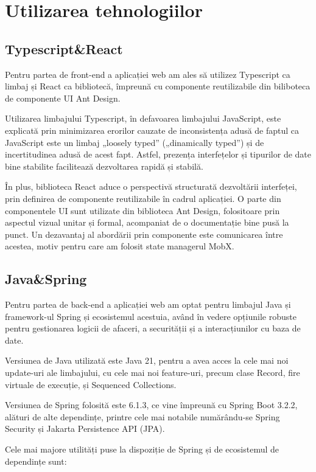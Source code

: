 \section{Utilizarea tehnologiilor}

\subsection{Typescript\&React}

Pentru partea de front-end a aplicației web am ales să utilizez Typescript ca limbaj și React ca bibliotecă, împreună cu componente reutilizabile din biliboteca de componente UI Ant Design.

Utilizarea limbajului Typescript, în defavoarea limbajului JavaScript, este explicată prin minimizarea erorilor cauzate de inconsistența adusă de faptul ca JavaScript este un limbaj „loosely typed” („dinamically typed”) și de incertitudinea adusă de acest fapt. Astfel, prezența interfețelor și tipurilor de date bine stabilite facilitează dezvoltarea rapidă și stabilă.

În plus, biblioteca React aduce o perspectivă structurată dezvoltării interfeței, prin definirea de componente reutilizabile în cadrul aplicației. O parte din componentele UI sunt utilizate din biblioteca Ant Design, folositoare prin aspectul vizual unitar și formal, acompaniat de o documentație bine pusă la punct. Un dezavantaj al abordării prin componente este comunicarea între acestea, motiv pentru care am folosit state managerul MobX. 

\subsection{Java\&Spring}
Pentru partea de back-end a aplicației web am optat pentru limbajul Java și framework-ul Spring și ecosistemul acestuia, având în vedere opțiunile robuste pentru gestionarea logicii de afaceri, a securității și a interacțiunilor cu baza de date.

Versiunea de Java utilizată este Java 21, pentru a avea acces la cele mai noi update-uri ale limbajului, cu cele mai noi feature-uri, precum clase Record, fire virtuale de execuție, și Sequenced Collections. 

Versiunea de Spring folosită este 6.1.3, ce vine împreună cu Spring Boot 3.2.2, alături de alte dependințe, printre cele mai notabile numărându-se Spring Security și Jakarta Persistence API (JPA).

Cele mai majore utilități puse la dispoziție de Spring și de ecosistemul de dependințe sunt:

